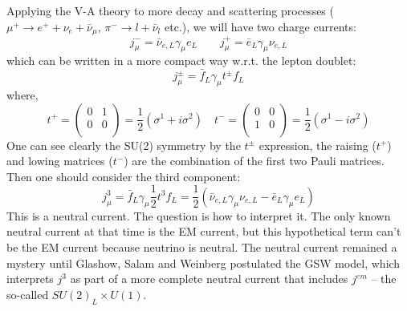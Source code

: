 Applying the V-A theory to more decay and scattering processes 
( $\mu^+ \rightarrow e^+ + \nu_e + \bar{\nu}_\mu$, $\pi^- \rightarrow l + \bar{\nu}_l$ etc.), 
we will have two charge currents:
\begin{equation}
    j_\mu^- = \bar{\nu}_{e, L} \gamma_\mu e_L	\qquad 
    j_\mu^+ = \bar{e}_L \gamma_\mu \nu_{e,L}
\end{equation}
which can be written in a more compact way w.r.t. the lepton doublet:
\begin{equation}
    j_\mu^\pm = \bar{f}_L \gamma_\mu t^\pm f_L
\end{equation}
where,
\begin{equation}
    t^+  =
    \begin{pmatrix}
	0   & 1	\\
	0   & 0	\\
    \end{pmatrix}
    = \frac{1}{2}(\sigma^1 + i\sigma^2)
    \quad
    t^-  =
    \begin{pmatrix}
	0   & 0	\\
	1   & 0	\\
    \end{pmatrix}
    = \frac{1}{2}(\sigma^1 - i\sigma^2)
\end{equation}
One can see clearly the SU(2) symmetry by the $t^\pm$ expression, the raising ($t^+$)
and lowing matrices ($t^-$) are the combination of the first two Pauli matrices.
Then one should consider the third component:
\begin{equation}
    j_\mu^3 = \bar{f}_L \gamma_\mu \frac{1}{2}t^3 f_L = \frac{1}{2} (\bar{\nu}_{e, L} \gamma_\mu \nu_{e, L} - \bar{e}_{L} \gamma_\mu e_L)
\end{equation}
This is a neutral current. The question is how to interpret it.
The only known neutral current at that time is the EM current, but this 
hypothetical term can't be the EM current because neutrino is neutral.
The neutral current remained a mystery until
Glashow, Salam and Weinberg postulated the GSW model, which interprets $j^3$ as
part of a more complete neutral current that includes $j^{em}$ -- the so-called
$SU(2)_L \times U(1)$.


